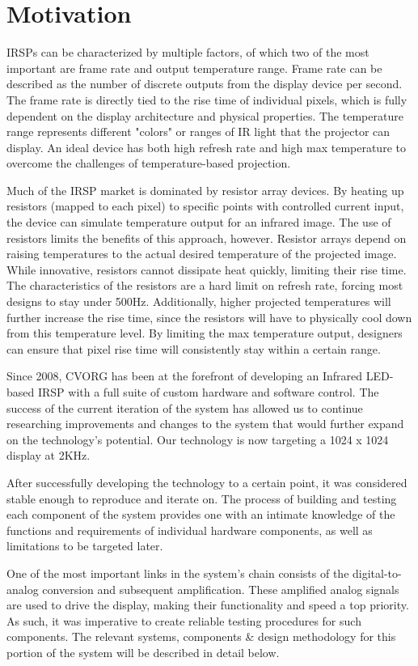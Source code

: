 \section {Motivation}
IRSPs can be characterized by multiple factors, of which two of the most important are frame rate and output temperature range. Frame rate can be described as the number of discrete outputs from the display device per second. The frame rate is directly tied to the rise time of individual pixels, which is fully dependent on the display architecture and physical properties. The temperature range represents different "colors" or ranges of IR light that the projector can display. An ideal device has both high refresh rate and high max temperature to overcome the challenges of temperature-based projection. \cite{marks} \par
Much of the IRSP market is dominated by resistor array devices. By heating up resistors (mapped to each pixel) to specific points with controlled current input, the device can simulate temperature output for an infrared image. The use of resistors limits the benefits of this approach, however. \cite{spie:2015} Resistor arrays depend on raising temperatures to the actual desired temperature of the projected image. While innovative, resistors cannot dissipate heat quickly, limiting their rise time. The characteristics of the resistors are a hard limit on refresh rate, forcing most designs to stay under 500Hz. Additionally, higher projected temperatures will further increase the rise time, since the resistors will have to physically cool down from this temperature level. By limiting the max temperature output, designers can ensure that pixel rise time will consistently stay within a certain range. \par
Since 2008, CVORG has been at the forefront of developing an Infrared LED-based IRSP with a full suite of custom hardware and software control. \cite{peyman} The success of the current iteration of the system has allowed us to continue researching improvements and changes to the system that would further expand on the technology's potential. Our technology is now targeting a 1024 x 1024 display at 2KHz. \par
After successfully developing the technology to a certain point, it was considered stable enough to reproduce and iterate on. The process of building and testing each component of the system provides one with an intimate knowledge of the functions and requirements of individual hardware components, as well as limitations to be targeted later. \par
One of the most important links in the system's chain consists of the digital-to-analog conversion and subsequent amplification. These amplified analog signals are used to drive the display, making their functionality and speed a top priority. \cite{tianne} As such, it was imperative to create reliable testing procedures for such components. The relevant systems, components \& design methodology for this portion of the system will be described in detail below. \par
